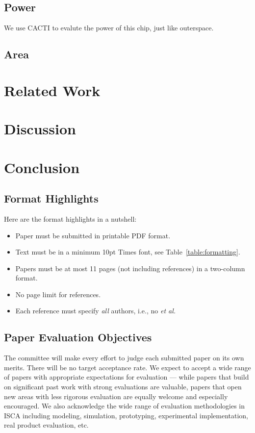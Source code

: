 \documentclass[conference]{IEEEtran}
\begin{document}
\subsection{Power}
We use CACTI \cite{cacti6} to evalute the power of this chip,
just like outerspace.

\subsection{Area}



\section{Related Work}

\section{Discussion}


\section{Conclusion}

\subsection{Format Highlights}

Here are the format highlights in a nutshell:
\begin{itemize}
\item Paper must be submitted in printable PDF format.
\item Text must be in a minimum 10pt Times font, see Table~\ref{table:formatting}.
\item Papers must be at most 11 pages (not including references) in a
  two-column format.
\item No page limit for references.
\item Each reference must specify {\em all} authors, i.e., no {\em et al.}
\end{itemize}

\subsection{Paper Evaluation Objectives}
The committee will make every effort to judge each submitted paper on
its own merits. There will be no target acceptance rate. We expect to
accept a wide range of papers with appropriate expectations for
evaluation --- while papers that build on significant past work with
strong evaluations are valuable, papers that open new areas with less
rigorous evaluation are equally welcome and especially encouraged. We
also acknowledge the wide range of evaluation methodologies in ISCA including
modeling, simulation, prototyping, experimental implementation, real
product evaluation, etc.
\end{document}
